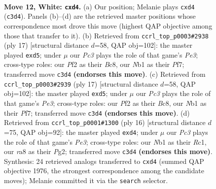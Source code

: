 \documentclass[11pt]{article}
\begin{document}
\clearpage

\begin{figure}[p]\centering
\begin{subfigure}{0.46\textwidth}\centering
\resizebox{\linewidth}{!}{%
\newchessgame
\chessboard[
  setfen={rnbq1rk1/pp3pbp/1n1p2p1/8/3p4/1BP1B3/PP3PPP/RN1QNRK1 w - - 0 12},
  showmover=false,
  pgfstyle=straightmove, color=movearrow, markmove={c3-d4}
]}
\caption{}
\end{subfigure}\hfill
\begin{subfigure}{0.46\textwidth}\centering
\resizebox{\linewidth}{!}{%
\newchessgame
\chessboard[
  setfen={r1bq1rk1/pp3ppp/2n1pn2/2bP4/8/1P3NP1/P3PPBP/RNBQ1RK1 b - - 0 9},
  showmover=false,
  pgfstyle=straightmove, color=movearrow, markmove={e6-d5}
]}
\caption{}
\end{subfigure}
\\[4pt]
\begin{subfigure}{0.46\textwidth}\centering
\resizebox{\linewidth}{!}{%
\newchessgame
\chessboard[
  setfen={r1bq1rk1/pp3ppp/2n1pn2/2bP4/8/1P3NP1/P3PPBP/RNBQ1RK1 b - - 0 9},
  showmover=false,
  pgfstyle=straightmove, color=movearrow, markmove={e6-d5}
]}
\caption{}
\end{subfigure}\hfill
\begin{subfigure}{0.46\textwidth}\centering
\resizebox{\linewidth}{!}{%
\newchessgame
\chessboard[
  setfen={rnbq1rk1/pp2ppbp/5np1/8/2Bp1B2/2N1PN2/PP3PPP/2RQK2R w K - 0 9},
  showmover=false,
  pgfstyle=straightmove, color=movearrow, markmove={e3-d4}
]}
\caption{}
\end{subfigure}
\caption{\textbf{Move 12, White: \texttt{cxd4}.} (a) Our position; Melanie plays \texttt{cxd4} (\texttt{c3d4}). Panels (b)--(d) are the retrieved master positions whose correspondence most drove this move (highest QAP objective among those that transfer to it). (b) Retrieved from \texttt{ccrl\_top\_p0003\#2938} (ply 17) [structural distance $d$=58, QAP obj=102]: the master played \texttt{exd5}; under $\mu$ our \emph{Pc3} plays the role of that game's \emph{Pe3}; cross-type roles: our \emph{P}f2 as their \emph{B}c8, our \emph{N}b1 as their \emph{P}f7; transferred move \texttt{c3d4} \textbf{(endorses this move)}. (c) Retrieved from \texttt{ccrl\_top\_p0003\#2939} (ply 17) [structural distance $d$=58, QAP obj=102]: the master played \texttt{exd5}; under $\mu$ our \emph{Pc3} plays the role of that game's \emph{Pe3}; cross-type roles: our \emph{P}f2 as their \emph{B}c8, our \emph{N}b1 as their \emph{P}f7; transferred move \texttt{c3d4} \textbf{(endorses this move)}. (d) Retrieved from \texttt{ccrl\_top\_p0001\#1300} (ply 16) [structural distance $d$=75, QAP obj=92]: the master played \texttt{exd4}; under $\mu$ our \emph{Pc3} plays the role of that game's \emph{Pe3}; cross-type roles: our \emph{N}b1 as their \emph{R}c1, our \emph{r}a8 as their \emph{P}g2; transferred move \texttt{c3d4} \textbf{(endorses this move)}. Synthesis: 24 retrieved analogs transferred to \texttt{cxd4} (summed QAP objective 1976, the strongest correspondence among the candidate moves); Melanie committed it via the \texttt{search} selector.}
\label{fig:thought-m22}
\end{figure}
\end{document}
